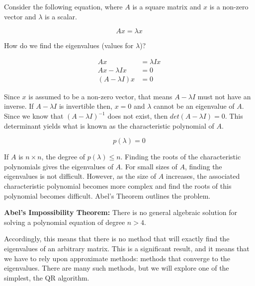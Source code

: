 \label{Ch:EigSolve}


Consider the following equation, where $A$ is a square matrix and $x$ is a non-zero vector and $\lambda$ is a scalar.

\begin{equation}
\label{eqn:eigval}
A x = \lambda x
\end{equation}

How do we find the eigenvalues (values for $\lambda$)?

\begin{equation*}
\begin{split}
 A x &= \lambda I x \\
A x - \lambda I x &= 0 \\
(A - \lambda I)x &= 0
\end{split}
\end{equation*}

Since $x$ is assumed to be a non-zero vector, that means $A-\lambda I$ must not have an inverse.  If $A-\lambda I$ is invertible then, $x=0$ and $\lambda$ cannot be an eigenvalue of $A$.  Since we know that $(A - \lambda I)^{-1}$ does not exist, then $det(A-\lambda I) = 0$.  This determinant yields what is known as the characteristic polynomial of $A$.

\begin{equation*}
 p(\lambda) = 0
\end{equation*}

If $A$ is $n \times n$, the degree of $p(\lambda) \leq n$.  Finding the roots of the characteristic polynomials gives the eigenvalues of $A$.  For small sizes of $A$, finding the eigenvalues is not difficult.  However, as the size of $A$ increases, the associated characteristic polynomial becomes more complex and find the roots of this polynomial becomes difficult.  Abel's Theorem  outlines the problem.

\begin{theorem}
\label{Theorem:Abel}
{\bf Abel's Impossibility Theorem:} There is no general algebraic solution for solving a polynomial equation of degree $n>4$.
\end{theorem}

Accordingly, this means that there is no method that will exactly find the eigenvalues of an arbitrary matrix. This is a significant result, and it means that we have to rely upon approximate methods: methods that converge to the eigenvalues. There are many such methods, but we will explore one of the simplest, the QR algorithm.

